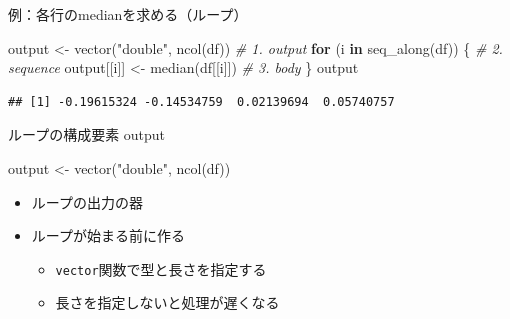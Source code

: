 \documentclass[
  ignorenonframetext,
  aspectratio=169]{beamer}
\newenvironment{Shaded}{\begin{snugshade}}{\end{snugshade}}
\newcommand{\CommentTok}[1]{\textcolor[rgb]{0.56,0.35,0.01}{\textit{#1}}}
\newcommand{\ControlFlowTok}[1]{\textcolor[rgb]{0.13,0.29,0.53}{\textbf{#1}}}
\newcommand{\FunctionTok}[1]{\textcolor[rgb]{0.00,0.00,0.00}{#1}}
\newcommand{\NormalTok}[1]{#1}
\newcommand{\OtherTok}[1]{\textcolor[rgb]{0.56,0.35,0.01}{#1}}
\newcommand{\StringTok}[1]{\textcolor[rgb]{0.31,0.60,0.02}{#1}}
\providecommand{\tightlist}{%
  \setlength{\itemsep}{0pt}\setlength{\parskip}{0pt}}
\begin{document}
\begin{frame}[fragile]{例：各行のmedianを求める（ループ）}
\protect\hypertarget{ux4f8bux5404ux884cux306emedianux3092ux6c42ux3081ux308bux30ebux30fcux30d7}{}
\begin{Shaded}
\begin{Highlighting}[]
\NormalTok{output }\OtherTok{\textless{}{-}} \FunctionTok{vector}\NormalTok{(}\StringTok{"double"}\NormalTok{, }\FunctionTok{ncol}\NormalTok{(df))  }\CommentTok{\# 1. output}
\ControlFlowTok{for}\NormalTok{ (i }\ControlFlowTok{in} \FunctionTok{seq\_along}\NormalTok{(df)) \{            }\CommentTok{\# 2. sequence}
\NormalTok{  output[[i]] }\OtherTok{\textless{}{-}} \FunctionTok{median}\NormalTok{(df[[i]])      }\CommentTok{\# 3. body}
\NormalTok{\}}
\NormalTok{output}
\end{Highlighting}
\end{Shaded}

\begin{verbatim}
## [1] -0.19615324 -0.14534759  0.02139694  0.05740757
\end{verbatim}
\end{frame}

\begin{frame}[fragile]{ループの構成要素 output}
\protect\hypertarget{ux30ebux30fcux30d7ux306eux69cbux6210ux8981ux7d20-output}{}
\begin{Shaded}
\begin{Highlighting}[]
\NormalTok{output }\OtherTok{\textless{}{-}} \FunctionTok{vector}\NormalTok{(}\StringTok{"double"}\NormalTok{, }\FunctionTok{ncol}\NormalTok{(df))}
\end{Highlighting}
\end{Shaded}

\begin{itemize}
\tightlist
\item
  ループの出力の器
\item
  ループが始まる前に作る

  \begin{itemize}
  \tightlist
  \item
    \texttt{vector}関数で型と長さを指定する
  \item
    長さを指定しないと処理が遅くなる
  \end{itemize}
\end{itemize}
\end{frame}
\end{document}
